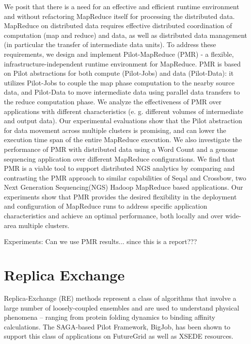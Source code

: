 \documentclass[]{paper}
\begin{document}
We posit that there is a need for an effective and efficient runtime environment and without refactoring MapReduce itself for processing the distributed data. MapReduce on distributed data requires effective distributed coordination of computation (map and reduce) and data, as well as distributed data management (in particular the transfer of intermediate data units). To address these requirements, we design and implement Pilot-MapReduce (PMR) - a flexible, infrastructure-independent runtime environment for MapReduce. PMR is based on Pilot abstractions for both compute (Pilot-Jobs) and data (Pilot-Data): it utilizes Pilot-Jobs to couple the map phase computation to the nearby source data, and Pilot-Data to move intermediate data using parallel data transfers to the reduce computation phase. We analyze the effectiveness of PMR over applications with different characteristics (e. g. different volumes of intermediate and output data). Our experimental evaluations show that the Pilot abstraction for data movement across multiple clusters is promising, and can lower the execution time span of the entire MapReduce execution. We also investigate the performance of PMR with distributed data using a Word Count and a genome sequencing application over different MapReduce configurations.  We find that PMR is a viable tool to support distributed NGS analytics by comparing and contrasting the PMR approach to similar capabilities of Seqal and Crossbow, two Next Generation Sequencing(NGS) Hadoop MapReduce based applications. Our experiments show that PMR provides the desired flexibility in the deployment and configuration of MapReduce runs to address specific application characteristics and achieve an optimal performance, both locally and over wide-area multiple clusters.

Experiments:
  Can we use PMR results... since this is a report???



\section{Replica Exchange}

Replica-Exchange (RE) methods represent a class of algorithms that involve a large number of loosely-coupled ensembles 
and are used to understand physical phenomena – ranging from protein folding dynamics to binding affinity calculations. The SAGA-based Pilot Framework, BigJob, has been shown to support this class of applications on FutureGrid as well as XSEDE resources.
\end{document}
